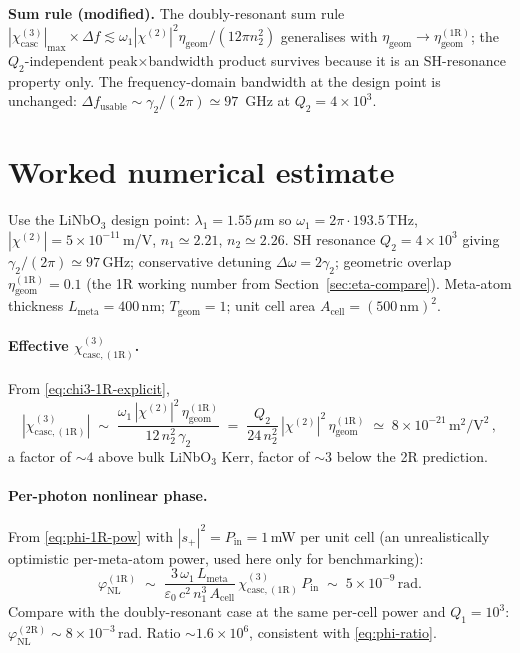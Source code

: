 \documentclass[11pt,a4paper]{article}
\newcommand{\eps}{\varepsilon}
\newcommand{\chitwo}{\chi^{(2)}}
\newcommand{\chithree}{\chi^{(3)}}
\newcommand{\Dom}{\Delta\omega}
\newcommand{\chicascOneR}{\chi^{(3)}_{\text{casc},(1\mathrm R)}}
\begin{document}
\textbf{Sum rule (modified).}  The doubly-resonant sum rule
$|\chithree_\text{casc}|_\text{max}\!\times\!\Delta f\!\lesssim\!
\omega_1|\chitwo|^{2}\eta_\text{geom}/(12\pi n_2^{2})$ generalises with
$\eta_\text{geom}\to\eta_\text{geom}^{(1\mathrm R)}$; the $Q_2$-independent
peak$\times$bandwidth product survives because it is an SH-resonance
property only.  The frequency-domain bandwidth at the design point is
unchanged: $\Delta f_\text{usable}\sim\gamma_2/(2\pi)\simeq 97$~GHz at
$Q_2=4\!\times\!10^{3}$.

\section{Worked numerical estimate}\label{sec:numbers}

Use the LiNbO$_3$ design point: $\lambda_1=1.55\,\mu$m so $\omega_1=2\pi\cdot
193.5\,$THz, $|\chitwo|=5\!\times\!10^{-11}\,$m/V, $n_1\!\simeq\!2.21$,
$n_2\!\simeq\!2.26$.  SH resonance $Q_2=4\!\times\!10^{3}$ giving
$\gamma_2/(2\pi)\simeq 97\,$GHz; conservative detuning $\Dom=2\gamma_2$;
geometric overlap $\eta_\text{geom}^{(1\mathrm R)}=0.1$ (the 1R working
number from Section~\ref{sec:eta-compare}).  Meta-atom thickness
$L_\text{meta}=400$\,nm; $T_\text{geom}=1$; unit cell area
$A_\text{cell}=(500\,\text{nm})^{2}$.

\paragraph{Effective $\chicascOneR$.}
From \eqref{eq:chi3-1R-explicit},
\begin{equation}
  |\chicascOneR|
   \;\sim\;\frac{\omega_1\,|\chitwo|^{2}\,\eta_\text{geom}^{(1\mathrm R)}}
                  {12\,n_2^{2}\,\gamma_2}
   \;=\;\frac{Q_2}{24\,n_2^{2}}\,|\chitwo|^{2}\,\eta_\text{geom}^{(1\mathrm R)}
   \;\simeq\;8\!\times\!10^{-21}\,\mathrm{m^{2}/V^{2}}\,,
\end{equation}
a factor of $\sim 4$ above bulk LiNbO$_3$ Kerr, factor of $\sim 3$ below
the 2R prediction.

\paragraph{Per-photon nonlinear phase.}
From \eqref{eq:phi-1R-pow} with $|s_+|^{2}=P_\text{in}=1\,$mW per unit cell
(an unrealistically optimistic per-meta-atom power, used here only for
benchmarking):
\begin{equation}
  \varphi_\text{NL}^{(1\mathrm R)}
   \;\sim\;\frac{3\,\omega_1\,L_\text{meta}}{\eps_0\,c^{2}\,n_1^{3}\,A_\text{cell}}\,
            \chicascOneR\,P_\text{in}
   \;\sim\;5\!\times\!10^{-9}\,\text{rad}.
\end{equation}
Compare with the doubly-resonant case at the same per-cell power and
$Q_1=10^{3}$: $\varphi_\text{NL}^{(2\mathrm R)}\sim 8\!\times\!10^{-3}\,$rad.
Ratio $\sim 1.6\!\times\!10^{6}$, consistent with \eqref{eq:phi-ratio}.
\end{document}
